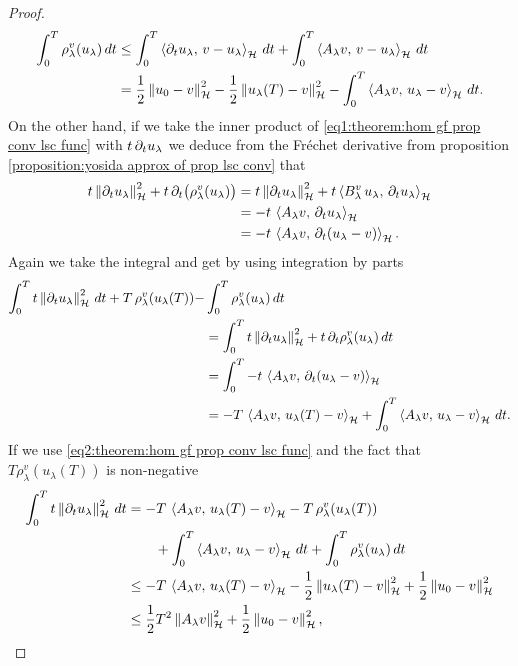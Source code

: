 \begin{proof}
\begin{align}
		\begin{split}
			\int_0^T \rho_\lambda^v(u_\lambda)\,dt
			&\leq \int_0^T\left\langle \partial_t u_\lambda,\,v-u_\lambda\right\rangle_{\mathcal{H}}\, dt
			+\int_0^T\left\langle A_\lambda v,\,v-u_\lambda\right\rangle_{\mathcal{H}}\,dt\\
			&=\frac{1}{2}\left\Vert u_0-v\right\Vert_{\mathcal{H}}^2
			-\frac{1}{2}\left\Vert u_\lambda(T)-v\right\Vert_{\mathcal{H}}^2
			-\int_0^T\left\langle A_\lambda v,\,u_\lambda-v\right\rangle_{\mathcal{H}}\,dt.
		\end{split}
	\end{align}
	On the other hand, if we take
	the inner product of
	\eqref{eq1:theorem:hom gf prop conv lsc func}
	with $ t\, \partial_t u_\lambda $ we deduce
	from the Fréchet derivative from proposition
	\ref{proposition:yosida approx of prop lsc conv} that
	\begin{align*}
		t\left\Vert \partial_t u_\lambda\right\Vert_{\mathcal{H}}^2 + 
		t\,\partial_t\big(\rho_\lambda^v(u_\lambda)\big)
		&=t\left\Vert \partial_t u_\lambda\right\Vert_{\mathcal{H}}^2 + 
		t\left\langle B_\lambda^v\,u_\lambda,\,\partial_t u_\lambda\right\rangle_{\mathcal{H}}\\
		&=-t\,\left\langle A_\lambda v,\,\partial_t u_\lambda\right\rangle_{\mathcal{H}}\\
		&=-t\,\left\langle A_\lambda v,\,\partial_t (u_\lambda-v)\right\rangle_{\mathcal{H}}.
	\end{align*}
	Again we take the integral and get by using integration by parts
	\begin{align*}
		\int_0^T t\left\Vert \partial_t u_\lambda\right\Vert_{\mathcal{H}}^2\,dt 
		+ T\,\rho_\lambda^v(u_\lambda(T))
		-& \int_0^T \rho_\lambda^v(u_\lambda)\,dt\\
		&=\int_0^T t\left\Vert \partial_t u_\lambda\right\Vert_{\mathcal{H}}^2+
		t\,\partial_t\rho_\lambda^v(u_\lambda)\,dt\\
		&=\int_0^T -t\,\left\langle A_\lambda v,\,\partial_t (u_\lambda-v)\right\rangle_{\mathcal{H}}\\
		&=-T\,\left\langle A_\lambda v,\,u_\lambda(T)-v\right\rangle_{\mathcal{H}}
		+\int_0^T \left\langle A_\lambda v,\,u_\lambda-v\right\rangle_{\mathcal{H}}\,dt.
	\end{align*}
	If we use
	\eqref{eq2:theorem:hom gf prop conv lsc func}
	and the fact that $ T\rho_\lambda^v(u_\lambda(T)) $ is non-negative
	\begin{align}\label{eq4:proposition:hom gf prop conv lsc func}
		\begin{split}
			\int_0^T t\norm{\prt_t u_\lambda}^2\,dt
			&=-T\,\inner{A_\lambda v}{u_\lambda(T)-v}
			- T\,\rho_\lambda^v(u_\lambda(T))\\
			&\qquad +\int_0^T \inner{A_\lambda v}{u_\lambda-v}\,dt
			+ \int_0^T \rho_\lambda^v(u_\lambda)\,dt\\
			&\leq -T\,\inner{A_\lambda v}{u_\lambda(T)-v}
			-\frac{1}{2}\norm{u_\lambda(T)-v}^2
			+ \frac{1}{2}\norm{u_0-v}^2\\
			&\leq \frac{1}{2}T^2\norm{A_\lambda v}^2+\frac{1}{2}\norm{u_0-v}^2,

\end{split}
\end{align}
\end{proof}
